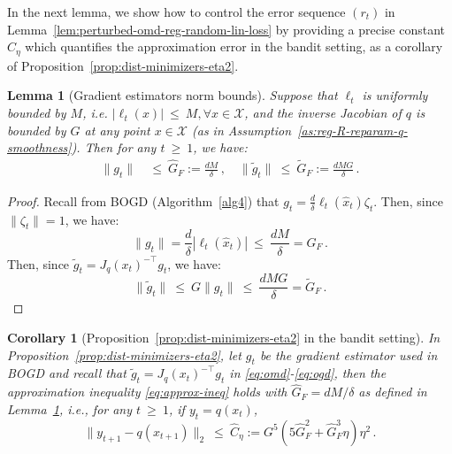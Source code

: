 \documentclass[a4paper,11pt,fullpage]{article}
\def\X{{\mathcal X}}
\theoremstyle{plain}
\newtheorem{lemma}{Lemma}
\newtheorem{corollary}[theorem]{Corollary}
\theoremstyle{definition}
\theoremstyle{plain}
\renewcommand{\leq}{~\le~}
\renewcommand{\geq}{~\ge~}
\begin{document}
In the next lemma, we show how to control the error sequence $(r_t)$ in Lemma~\ref{lem:perturbed-omd-reg-random-lin-loss} by providing a precise constant $\hat{C}_{\eta}$ which quantifies the approximation error in the bandit setting, as a corollary of Proposition~\ref{prop:dist-minimizers-eta2}. 

\begin{tcolorbox}[colframe=white!, top=2pt,left=2pt,right=2pt,bottom=2pt]
\begin{lemma}[Gradient estimators norm bounds]
\label{lem:grad-estimator-bounds}
Suppose that $\ell_t$ is uniformly bounded by $M$, i.e. $|\ell_t(x)| \leq M, \forall x \in \X$, and the inverse Jacobian of $q$ is bounded by $G$ at any point $x \in \X$ (as in Assumption~\ref{as:reg-R-reparam-q-smoothness}). Then for any $t \geq 1$, we have: 
\begin{align}
\|g_t\| &\leq \hat{G}_F := \frac{dM}{\delta}\,, \quad \|\tilde{g}_t\| \leq \tilde{G}_F := \frac{dM G}{\delta}\,.
\end{align}
\end{lemma}
\end{tcolorbox}

\begin{proof}
Recall from BOGD (Algorithm~\ref{alg4}) that $g_t = \frac{d}{\delta} \ell_t(\hat{x}_t) \zeta_t$. Then, since $\|\zeta_t\| = 1$, we have: 
\begin{equation*}
\|g_t\| = \frac{d}{\delta} |\ell_t(\hat{x}_t)| \leq \frac{dM}{\delta} = \hat{G}_F\,.
\end{equation*}
Then, since $\tilde{g}_t = J_q(x_t)^{-\top} g_t$, we have: 
\begin{equation*}
\|\tilde{g}_t\| \leq G \|g_t\| \leq \frac{dMG}{\delta} = \tilde{G}_F\,.
\end{equation*}
\end{proof}

\begin{tcolorbox}[colframe=white!, top=2pt,left=2pt,right=2pt,bottom=2pt]
\begin{corollary}[Proposition~\ref{prop:dist-minimizers-eta2} in the bandit setting]
\label{cor:approx-lemma-bandit}
In Proposition~\ref{prop:dist-minimizers-eta2}, let $g_t$ be the gradient estimator used in BOGD and recall that $\tilde{g}_t = J_q(x_t)^{-\top} g_t$ in \eqref{eq:omd}-\eqref{eq:ogd}, then the approximation inequality \eqref{eq:approx-ineq} holds with $\hat{G}_F = dM/\delta$ as defined in Lemma~\ref{lem:grad-estimator-bounds}, i.e., for any $t \geq 1$, if $y_t = q(x_t)$,  
\begin{equation*}
\|y_{t+1}-q(x_{t+1})\|_2 \leq \hat{C}_{\eta} :=  G^5 (5\hat{G}_F^2 + \hat{G}_F^3 \eta) \eta^2 \,.
\end{equation*}
\end{corollary}
\end{tcolorbox}
\end{document}
